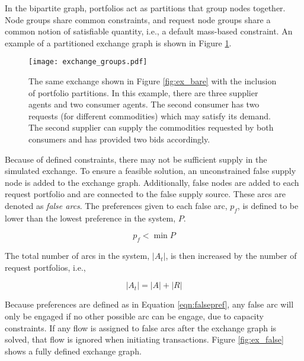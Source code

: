 In the bipartite graph, portfolios act as partitions that group nodes
together. Node groups share common constraints, and request node groups share a
common notion of satisfiable quantity, i.e., a default mass-based constraint. An
example of a partitioned exchange graph is shown in Figure \ref{fig:ex_groups}.

\begin{figure}
  \begin{center}
    \texttt{[image: exchange\_groups.pdf]}
    \caption{The same exchange shown in Figure \ref{fig:ex_bare} with the
      inclusion of portfolio partitions. In this example, there are three
      supplier agents and two consumer agents. The second consumer has two
      requests (for different commodities) which may satisfy its demand. The
      second supplier can supply the commodities requested by both consumers and
      has provided two bids accordingly.}
    \label{fig:ex_groups}
  \end{center}
\end{figure}

Because of defined constraints, there may not be sufficient supply in the
simulated exchange. To ensure a feasible solution, an unconstrained false supply
node is added to the exchange graph. Additionally, false nodes are added to each
request portfolio and are connected to the false supply source. These arcs are
denoted as \textit{false arcs}. The preferences given to each false arc, $p_f$,
is defined to be lower than the lowest preference in the system, $P$.

\begin{equation}\label{eqn:falsepref}
  p_{f} < \min P
\end{equation}

\noindent
The total number of arcs in the system, $\left|{A_t}\right|$, is then increased
by the number of request portfolios, i.e.,

\begin{equation}
  \left|{A_t}\right| = \left|{A}\right| + \left|{R}\right|
\end{equation}

Because preferences are defined as in Equation \ref{eqn:falsepref}, any false
arc will only be engaged if no other possible arc can be engage, due to capacity
constraints. If any flow is assigned to false arcs after the exchange graph is
solved, that flow is ignored when initiating transactions. Figure
\ref{fig:ex_false} shows a fully defined exchange graph.

